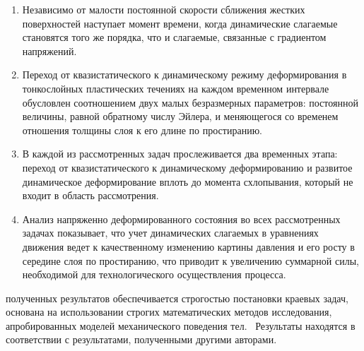 {}
\begin{enumerate}[beginpenalty=10000] %
    \item Независимо от малости постоянной скорости сближения жестких поверхностей наступает момент времени, когда динамические слагаемые становятся того же порядка, что и слагаемые, связанные с градиентом напряжений.
    \item Переход от квазистатического к динамическому режиму деформирования в тонкослойных пластических течениях на каждом временном интервале обусловлен соотношением двух малых безразмерных параметров: постоянной величины, равной обратному числу Эйлера, и меняющегося со временем отношения толщины слоя к его длине по простиранию.
    \item В каждой из рассмотренных задач прослеживается два временных этапа: переход от квазистатического к динамическому деформированию и развитое динамическое деформирование вплоть до момента схлопывания, который не входит в область рассмотрения.
    \item Анализ напряженно деформированного состояния во всех рассмотренных задачах показывает, что учет динамических слагаемых в уравнениях движения ведет к качественному изменению картины давления и его росту в середине слоя по простиранию, что приводит к увеличению суммарной силы, необходимой для технологического осуществления процесса.
\end{enumerate}

{\reliability} полученных результатов обеспечивается строгостью постановки краевых задач, основана на использовании строгих математических методов исследования, апробированных моделей механического поведения тел. \ Результаты находятся в соответствии с результатами, полученными другими авторами.


